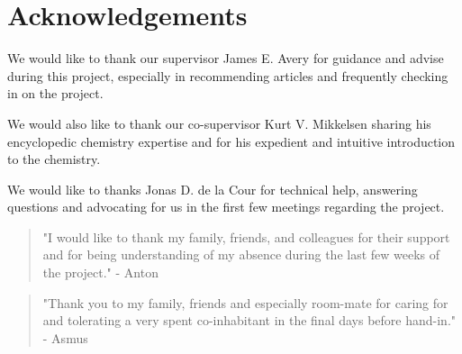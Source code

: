 \chapter*{Acknowledgements}
\label{chap:acknowl}

We would like to thank our supervisor James E. Avery for guidance and advise during this project, especially in recommending articles and frequently checking in on the project.

We would also like to thank our co-supervisor Kurt V. Mikkelsen sharing his encyclopedic chemistry expertise and for his expedient and intuitive introduction to the chemistry.

We would like to thanks Jonas D. de la Cour for technical help, answering questions and advocating for us in the first few meetings regarding the project.

\vspace*{\fill} 
\begin{quote} 
\centering 
"I would like to thank my family, friends, and colleagues for their support and for being understanding of my absence during the last few weeks of the project." - Anton
\end{quote}
\vspace*{2em}
\begin{quote} 
\centering 
"Thank you to my family, friends and especially room-mate for caring for and tolerating a very spent co-inhabitant in the final days before hand-in." - Asmus
\end{quote}
\vspace*{\fill}
\vspace*{\fill}
